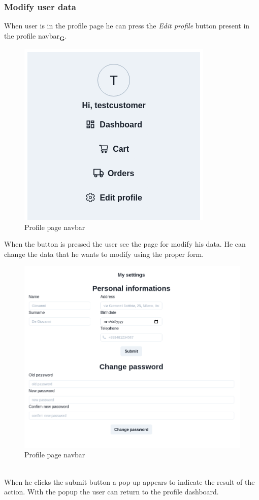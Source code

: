 \subsubsection{Modify user data}
When user is in the profile page he can press the \textit{Edit profile} button present in the profile navbar\textsubscript{\textbf{G}}.
\begin{figure}[!ht]
    \caption{Profile page navbar}
    \vspace{10px}
    \includegraphics[scale=0.5]{../../../../Images/userManual/dashboardNavBar.png}
    \centering
\end{figure}
When the button is pressed the user see the page for modify his data. He can change the data that he wants to modify using the proper form.
\begin{figure}[!ht]
    \caption{Profile page navbar}
    \vspace{10px}
    \includegraphics[scale=0.3]{../../../../Images/userManual/profileModfication.png}
    \centering
\end{figure}
\\
When he clicks the submit button a pop-up appears to indicate the result of the action. With the popup the user can return to the profile dashboard.
\newpage
